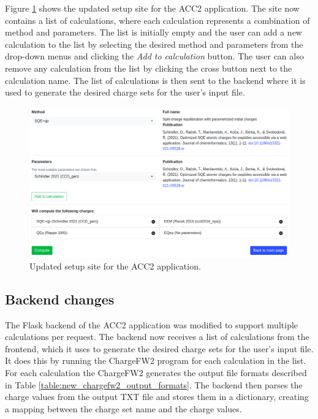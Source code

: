 \documentclass[
  digital,     %
  oneside,     %
  nosansbold,  %
  nocolorbold, %
  lof,         %
  lot,         %
]{fithesis4}
\begin{document}
Figure \ref{fig:new_setup} shows the updated setup site for the ACC2 application. The site now contains a list of calculations, where each calculation represents a combination of method and parameters. The list is initially empty and the user can add a new calculation to the list by selecting the desired method and parameters from the drop-down menus and clicking the \textit{Add to calculation} button. The user can also remove any calculation from the list by clicking the cross button next to the calculation name. The list of calculations is then sent to the backend where it is used to generate the desired charge sets for the user's input file.

\begin{figure}[htbp]
  \begin{center}
    \includegraphics[width=\textwidth]{figures/new_setup.png}
  \end{center}
  \caption{Updated setup site for the ACC2 application.}
  \label{fig:new_setup}
\end{figure}

\subsection{Backend changes}

The Flask backend of the ACC2 application was modified to support multiple calculations per request. The backend now receives a list of calculations from the frontend, which it uses to generate the desired charge sets for the user's input file. It does this by running the ChargeFW2 program for each calculation in the list. For each calculation the ChargeFW2 generates the output file formats described in Table \ref{table:new_chargefw2_output_formats}. The backend then parses the charge values from the output TXT file and stores them in a dictionary, creating a mapping between the charge set name and the charge values.
\end{document}
